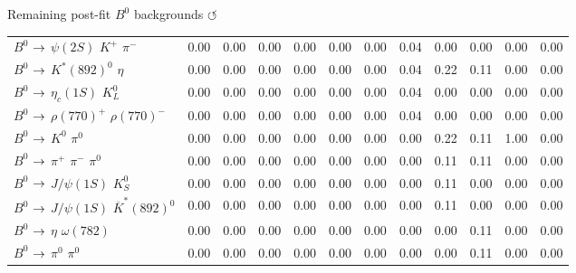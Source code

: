 \documentclass[xcolor=dvipsnames]{beamer}
\begin{document}
\begin{frame}{Remaining post-fit $B^0$ backgrounds \hyperlink{frame:A}{$\circlearrowleft$}}
{{\begin{tabular}{lrrrrrrrrrrr}
      $B^{0}$ $\rightarrow$ $\psi(2S)$ $K^{+}$ $\pi^{-}$              &         0.00 &         0.00 &         0.00 &         0.00 &         0.00 &         0.00 &         0.04 &         0.00 &         0.00 &         0.00 &         0.00 \\
      $B^{0}$ $\rightarrow$ $K^{*}(892)^{0}$ $\eta$                   &         0.00 &         0.00 &         0.00 &         0.00 &         0.00 &         0.00 &         0.04 &         0.22 &         0.11 &         0.00 &         0.00 \\
      $B^{0}$ $\rightarrow$ $\eta_{c}(1S)$ $K_{L}^{0}$                &         0.00 &         0.00 &         0.00 &         0.00 &         0.00 &         0.00 &         0.04 &         0.00 &         0.00 &         0.00 &         0.00 \\
      $B^{0}$ $\rightarrow$ $\rho(770)^{+}$ $\rho(770)^{-}$           &         0.00 &         0.00 &         0.00 &         0.00 &         0.00 &         0.00 &         0.04 &         0.00 &         0.00 &         0.00 &         0.00 \\
      $B^{0}$ $\rightarrow$ $K^{0}$ $\pi^{0}$                         &         0.00 &         0.00 &         0.00 &         0.00 &         0.00 &         0.00 &         0.00 &         0.22 &         0.11 &         1.00 &         0.00 \\
      $B^{0}$ $\rightarrow$ $\pi^{+}$ $\pi^{-}$ $\pi^{0}$             &         0.00 &         0.00 &         0.00 &         0.00 &         0.00 &         0.00 &         0.00 &         0.11 &         0.11 &         0.00 &         0.00 \\
      $B^{0}$ $\rightarrow$ $J/\psi(1S)$ $K_{S}^{0}$                  &         0.00 &         0.00 &         0.00 &         0.00 &         0.00 &         0.00 &         0.00 &         0.11 &         0.00 &         0.00 &         0.00 \\
      $B^{0}$ $\rightarrow$ $J/\psi(1S)$ $\overline{K}^{*}(892)^{0}$  &         0.00 &         0.00 &         0.00 &         0.00 &         0.00 &         0.00 &         0.00 &         0.11 &         0.00 &         0.00 &         0.00 \\
      $B^{0}$ $\rightarrow$ $\eta$ $\omega(782)$                      &         0.00 &         0.00 &         0.00 &         0.00 &         0.00 &         0.00 &         0.00 &         0.00 &         0.11 &         0.00 &         0.00 \\
      $B^{0}$ $\rightarrow$ $\pi^{0}$ $\pi^{0}$                       &         0.00 &         0.00 &         0.00 &         0.00 &         0.00 &         0.00 &         0.00 &         0.00 &         0.11 &         0.00 &         0.00 \\

\end{tabular}}}
\end{frame}
\end{document}
